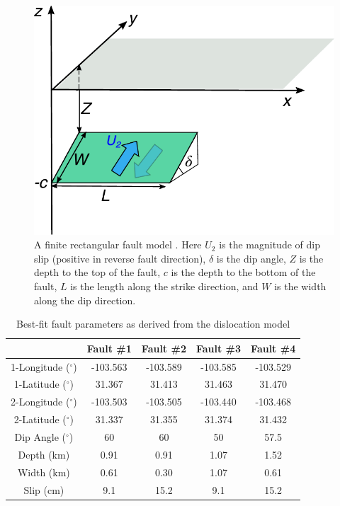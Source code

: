 \documentclass{utexasthesis}
\begin{document}
\begin{figure}
	\centering
	\includegraphics[width=\textwidth]{paper1-permian/figures/supplement/figureS6-fault-geom.pdf}
	\caption{A finite rectangular fault model \cite{Okada1992}. Here $U_2$ is the magnitude of dip slip (positive in reverse fault direction), $\delta$ is the dip angle, $Z$ is the depth to the top of the fault, $c$ is the depth to the bottom of the fault, $L$ is the length along the strike direction, and $W$ is the width along the dip direction.}
	\label{fig:model-fault-geom}
\end{figure}

\begin{table}
	\centering
	\caption{Best-fit fault parameters as derived from the dislocation model}
	\begin{tabular}{c|cccc}
		& Fault \#1      & Fault \#2      & Fault \#3      & Fault \#4      \\
		\hline
		1-Longitude ($^{\circ}$) & -103.563 & -103.589 & -103.585 & -103.529 \\
		1-Latitude ($^{\circ}$)  & 31.367   & 31.413   & 31.463   & 31.470   \\
		2-Longitude ($^{\circ}$) & -103.503 & -103.505 & -103.440 & -103.468 \\
		2-Latitude ($^{\circ}$)  & 31.337   & 31.355    & 31.374   & 31.432   \\
		Dip Angle ($^{\circ}$)   & 60       & 60       & 50       & 57.5       \\
		Depth (km)               & 0.91     & 0.91     & 1.07     & 1.52     \\
		Width (km)              & 0.61     & 0.30     & 1.07     & 0.61     \\
		Slip (cm)                & 9.1     & 15.2     & 9.1     & 15.2    \\
	\end{tabular}
	\label{tab:geo-mech-fault}
\end{table}
\end{document}
